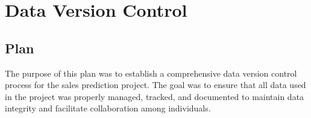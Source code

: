 %
%




\chapter{Data Version Control}

\section{Plan}

The purpose of this plan was to establish a comprehensive data version control process for the sales prediction project. The goal was to ensure that all data used in the project was properly managed, tracked, and documented to maintain data integrity and facilitate collaboration among individuals.
	
